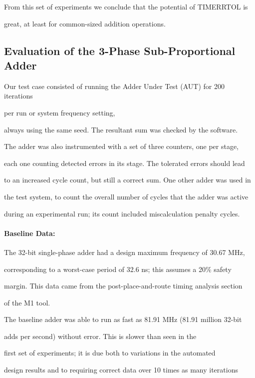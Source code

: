 \documentclass[12pt,dvips]{article}
\begin{document}
From this set of experiments we conclude that the potential of TIMERRTOL is

great, at least for common-sized addition operations.



\subsection{Evaluation of the 3-Phase Sub-Proportional Adder}

Our test case consisted of running the Adder Under Test (AUT) for 200 iterations

per run or system frequency setting,

always using the same seed. The resultant sum was checked by the software.

The adder was also instrumented with a set of three counters, one per stage,

each one counting detected errors in its stage. The tolerated errors should lead

to an increased cycle count, but still a correct sum. One other adder was used in

the test system, to count the overall number of cycles that the adder was active

during an experimental run; its count included miscalculation penalty cycles.



\paragraph{Baseline Data: }

The 32-bit single-phase adder had a design maximum frequency of 30.67 MHz,

corresponding to a worst-case period of 32.6 ns; this assumes a 20\% safety

margin. This data came from the post-place-and-route timing analysis section

of the M1 tool.



The baseline adder was able to run as fast as 81.91 MHz (81.91 million 32-bit

adds per second) without error. This is slower than seen in the

first set of experiments; it is due both to variations in the automated

design results and to requiring correct data over 10 times as many iterations
\end{document}
